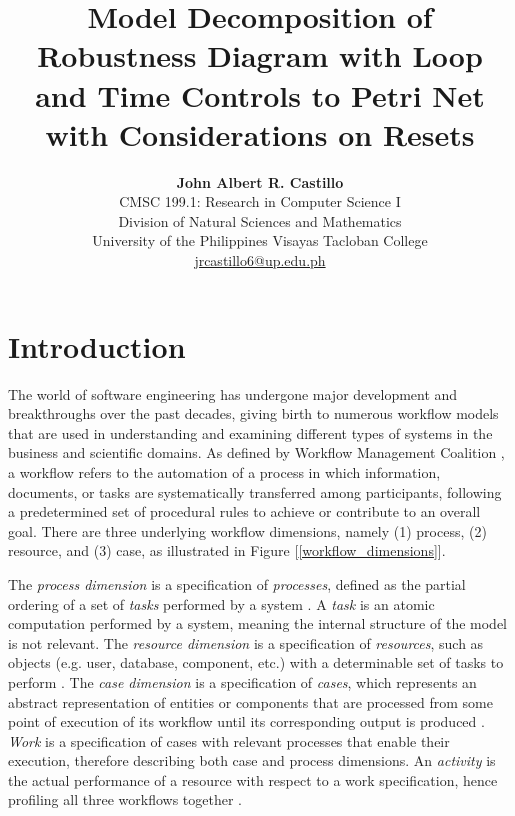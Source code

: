 \documentclass[12pt]{article}
\title{\bf Model Decomposition of Robustness Diagram with Loop and Time Controls to Petri Net with Considerations on Resets}
\author{{\bf John Albert R. Castillo} \\
CMSC 199.1: Research in Computer Science I \\
Division of Natural Sciences and Mathematics \\
University of the Philippines Visayas Tacloban College \\
{\small \href{mailto:jrcastillo6@up.edu.ph}{jrcastillo6@up.edu.ph}}
}
\begin{document}
    \maketitle
    \thispagestyle{empty} %
    \pagebreak

    \tableofcontents
    \pagebreak

    \section{Introduction}
    The world of software engineering has undergone major development and breakthroughs over the past decades, giving birth to numerous workflow models that are used in understanding and examining different types of systems in the business and scientific domains. As defined by Workflow Management Coalition \cite{workflow}, a workflow refers to the automation of a process in which information, documents, or tasks are systematically transferred among participants, following a predetermined set of procedural rules to achieve or contribute to an overall goal. There are three underlying workflow dimensions, namely (1) process, (2) resource, and (3) case, as illustrated in Figure [\ref{workflow_dimensions}]. \par

    The \textit{process dimension} is a specification of \textit{processes}, defined as the partial ordering of a set of \textit{tasks} performed by a system \cite{malinao-rdlt}. A \textit{task} is an atomic computation performed by a system, meaning the internal structure of the model is not relevant. The \textit{resource dimension} is a specification of \textit{resources}, such as objects (e.g. user, database, component, etc.) with a determinable set of tasks to perform \cite{malinao-rdlt}. The \textit{case dimension} is a specification of \textit{cases}, which represents an abstract representation of entities or components that are processed from some point of execution of its workflow until its corresponding output is produced \cite{malinao-rdlt}. \textit{Work} is a specification of cases with relevant processes that enable their execution, therefore describing both case and process dimensions. An \textit{activity} is the actual performance of a resource with respect to a work specification, hence profiling all three workflows together \cite{malinao-rdlt}.
\end{document}
